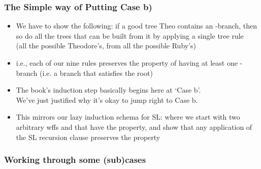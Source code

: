 \begin{frame}
\frametitle{The Simple way of Putting Case b)}

\begin{itemize}[<+->]

\item We have to show the following: if a good tree Theo contains an -branch, then so do all the trees that can be built from it by applying a single tree rule \\ (all the possible Theodore's, from all the possible Ruby's) 

\item i.e., each of our nine rules preserves the property of having at least one -branch (i.e. a branch that satisfies the root)

\item The book's induction step basically begins here at `Case b'. \\ We've just justified why it's okay to jump right to Case b. 


\item This mirrors our lazy induction schema for SL: where we start with two arbitrary wffs \PH and \PS that have the property, and show that any application of the SL recursion clause preserves the property 

\end{itemize}
\end{frame}

\subsubsection{Working through some (sub)cases}

